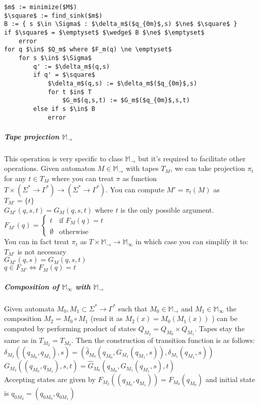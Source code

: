 \documentclass[12pt]{article}
\begin{document}
\begin{lstlisting}
$m$ := minimize($M$)
$\square$ := find_sink($m$)
B := { s $\in \Sigma$ : $\delta_m$($q_{0m}$,s) $\ne$ $\square$ }
if $\square$ = $\emptyset$ $\wedge$ B $\ne$ $\emptyset$
    error
for q $\in$ $Q_m$ where $F_m(q) \ne \emptyset$ 
    for s $\in$ $\Sigma$
        q' := $\delta_m$(q,s)
        if q' = $\square$ 
            $\delta_m$(q,s) := $\delta_m$($q_{0m}$,s)
            for t $in$ T
                $G_m$(q,s,t) := $G_m$($q_{0m}$,s,t)
        else if s $\in$ B
            error
\end{lstlisting}

\subparagraph{Tape projection $\mathbb{M}_\rightarrow$} This operation is very specific to class $\mathbb{M}_\rightarrow$ but it's required to facilitate other operations. Given automaton $M \in \mathbb{M}_\rightarrow$ with tapes $T_M$, we can take projection $\pi_t$ for any $t\in T_M$ where you can treat $\pi$ as function $T \times (\Sigma^* \rightarrow \Gamma^*) \rightarrow (\Sigma^* \rightarrow \Gamma^*)$. You can compute $M' = \pi_t(M)$ as \\
 $T_{M'} = \{t\}$ \\
 $G_{M'}(q,s,t) = G_M(q,s,t)$ where $t$ is the only possible argument. \\
 $F_{M'}(q) = \begin{cases}
 t & \mbox{if } F_M(q) = t \\
 \emptyset & \mbox{otherwise}
 \end{cases}$ \\
 You can in fact treat $\pi_t$ as $T \times \mathbb{M}_\rightarrow \rightarrow \mathbb{M}_\infty$ in which case you can simplify it to: \\
  $T_{M'}$ is not necessary \\
 $G_{M'}(q,s) = G_M(q,s,t)$ \\
 $q \in F_{M'} \iff F_M(q) = t$ \\

\subparagraph{Composition of $\mathbb{M}_\infty$ with $\mathbb{M}_\rightarrow$} Given automata $M_0,M_1 \subset \Sigma^* \rightarrow \Gamma^*$ such that  $M_0 \in \mathbb{M}_\rightarrow$ and $M_1 \in \mathbb{M}_\infty$ the composition $M_2=M_0 \circ M_1$ (read it as $M_2(x) = M_0(M_1(x))$ ) can be computed by performing product of states $Q_{M_2} = Q_{M_0} \times Q_{M_1}$. Tapes stay the same as in $T_{M_2} = T_{M_0}$. Then the construction of transition function is as follows:\\
$\delta_{M_2}((q_{M_0},q_{M_1}),s) = 
( \hat{\delta}_{M_0}(q_{M_0},G_{M_1}(q_{M_1},s) ) , \delta_{M_1}(q_{M_1},s) )
$\\
$G_{M_2}((q_{M_0},q_{M_1}),s,t) = \hat{G}_{M_0}(q_{M_0}, G_{M_1}(q_{M_1},s),t )
$\\
Accepting states are given by $F_{M_2}((q_{M_0},q_{M_1})) = F_{M_0}(q_{M_0})$ and initial state is $q_{0M_2} = (q_{0M_0},q_{0M_1})$
\end{document}
